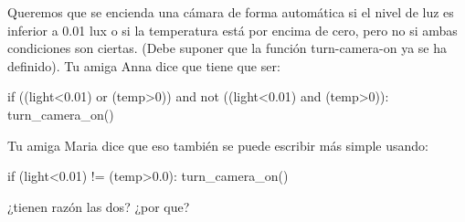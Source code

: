 \begin{ejercicio}Queremos que se encienda una cámara de forma automática si el nivel de luz es inferior a 0.01 lux o si la temperatura está por encima de cero, pero no si ambas condiciones son ciertas. (Debe suponer que la función turn-camera-on ya se ha definido). Tu amiga Anna dice que tiene que ser:



\begin{python}
if ((light<0.01) or (temp>0)) and  not ((light<0.01) and (temp>0)):
	turn_camera_on()
\end{python}

Tu amiga Maria dice que eso también se puede escribir más simple usando:

\begin{python}
if (light<0.01) != (temp>0.0):
	turn_camera_on()
\end{python}

¿tienen razón las dos? ¿por que?
\end{ejercicio}





